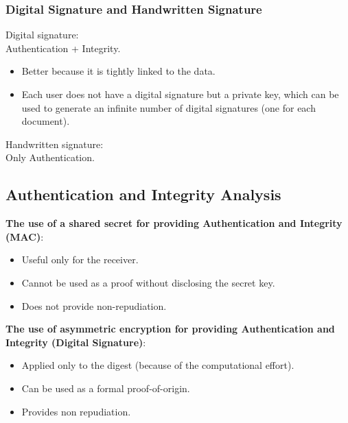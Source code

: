 \subsubsection*{Digital Signature and Handwritten Signature}
\begin{multicols}{2}

    Digital signature: \\ Authentication + Integrity.
    \begin{itemize}
        \item Better because it is tightly linked to the data.
        \item Each user does not have a digital signature but a private key, which can be used to generate an infinite number of digital signatures (one for each document).
    \end{itemize}
    \columnbreak

    

    Handwritten signature: \\ Only Authentication.
    
\end{multicols}

\clearpage

\subsection{Authentication and Integrity Analysis}


\begin{multicols}{2}

    \textbf{The use of a shared secret for providing Authentication and Integrity (MAC)}:
    \begin{itemize}
        \item Useful only for the receiver.
        \item Cannot be used as a proof without disclosing the secret key.
        \item Does not provide non-repudiation.
    \end{itemize}
\columnbreak

\textbf{The use of asymmetric encryption for providing Authentication and Integrity (Digital Signature)}:
\begin{itemize}
    \item Applied only to the digest (because of the computational effort).
    \item Can be used as a formal proof-of-origin.
    \item Provides non repudiation.
\end{itemize}
\end{multicols}



